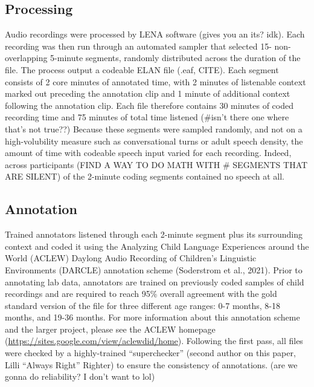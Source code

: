 \documentclass[english,man]{apa6}
\begin{document}
\hypertarget{processing}{%
\subsection{Processing}\label{processing}}

Audio recordings were processed by LENA software (gives you an its? idk). Each recording was then run through an automated sampler that selected 15- non-overlapping 5-minute segments, randomly distributed across the duration of the file. The process output a codeable ELAN file (.eaf, CITE). Each segment consists of 2 core minutes of annotated time, with 2 minutes of listenable context marked out preceding the annotation clip and 1 minute of additional context following the annotation clip. Each file therefore contains 30 minutes of coded recording time and 75 minutes of total time listened (\#isn't there one where that's not true??) Because these segments were sampled randomly, and not on a high-volubility measure such as conversational turns or adult speech density, the amount of time with codeable speech input varied for each recording. Indeed, across participants (FIND A WAY TO DO MATH WITH \# SEGMENTS THAT ARE SILENT) of the 2-minute coding segments contained no speech at all.

\hypertarget{annotation}{%
\subsection{Annotation}\label{annotation}}

Trained annotators listened through each 2-minute segment plus its surrounding context and coded it using the Analyzing Child Language Experiences around the World (ACLEW) Daylong Audio Recording of Children's Linguistic Environments (DARCLE) annotation scheme (Soderstrom et al., 2021). Prior to annotating lab data, annotators are trained on previously coded samples of child recordings and are required to reach 95\% overall agreement with the gold standard version of the file for three different age ranges: 0-7 months, 8-18 months, and 19-36 months. For more information about this annotation scheme and the larger project, please see the ACLEW homepage (\url{https://sites.google.com/view/aclewdid/home}). Following the first pass, all files were checked by a highly-trained \enquote{superchecker} (second author on this paper, Lilli \enquote{Always Right} Righter) to ensure the consistency of annotations. (are we gonna do reliability? I don't want to lol)
\end{document}
